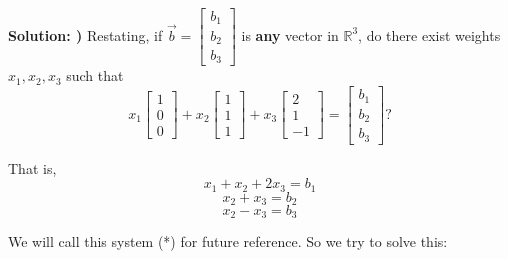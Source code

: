 \documentclass{article}
\begin{document}
\textbf{Solution: )}
Restating, if $\vec{b} = \begin{bmatrix} b_1 \\ b_2 \\ b_3 \end{bmatrix}$ is \textbf{any} vector in $\mathbb{R}^3$, do there exist weights $x_1, x_2, x_3$ such that $$x_1 \begin{bmatrix} 1 \\ 0 \\ 0 \end{bmatrix} + x_2 \begin{bmatrix} 1 \\ 1 \\ 1 \end{bmatrix} + x_3 \begin{bmatrix} 2 \\ 1 \\ -1 \end{bmatrix} = \begin{bmatrix} b_1 \\ b_2 \\ b_3 \end{bmatrix}?$$
 
That is, $$ x_1 + x_2 + 2x_3 = b_1$$ $$x_2 + x_3 = b_2$$ $$x_2 - x_3 = b_3$$ 

We will call this system (*) for future reference. So we try to solve this:
\end{document}
